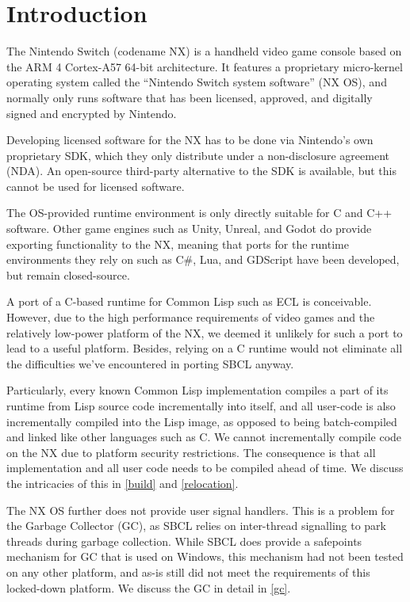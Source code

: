 \documentclass[format=sigconf]{acmart}
\begin{document}
\def\abovecaptionskip{1pt}
\def\listingautorefname{Listing}
\def\figureautorefname{Figure}

\section{Introduction}\label{introduction}
The Nintendo Switch (codename NX) is a handheld video game console based on the ARM 4 Cortex-A57 64-bit architecture\cite{morgan2020}. It features a proprietary micro-kernel operating system called the ``Nintendo Switch system software''\cite{roussel2019methodically} (NX OS), and normally only runs software that has been licensed, approved, and digitally signed and encrypted by Nintendo.

Developing licensed software for the NX has to be done via Nintendo's own proprietary SDK, which they only distribute under a non-disclosure agreement (NDA). An open-source third-party alternative to the SDK is available\cite{switchbrew}, but this cannot be used for licensed software.

The OS-provided runtime environment is only directly suitable for C and C++ software. Other game engines such as Unity, Unreal, and Godot do provide exporting functionality to the NX, meaning that ports for the runtime environments they rely on such as C\#, Lua, and GDScript have been developed, but remain closed-source.

A port of a C-based runtime for Common Lisp such as ECL\cite{attardi1994embeddable} is conceivable. However, due to the high performance requirements of video games and the relatively low-power platform of the NX, we deemed it unlikely for such a port to lead to a useful platform. Besides, relying on a C runtime would not eliminate all the difficulties we've encountered in porting SBCL anyway.

Particularly, every known Common Lisp implementation compiles a part of its runtime from Lisp source code incrementally into itself, and all user-code is also incrementally compiled into the Lisp image, as opposed to being batch-compiled and linked like other languages such as C. We cannot incrementally compile code on the NX due to platform security restrictions. The consequence is that all implementation and all user code needs to be compiled ahead of time. We discuss the intricacies of this in \autoref{build} and \autoref{relocation}.

The NX OS further does not provide user signal handlers. This is a problem for the Garbage Collector (GC), as SBCL relies on inter-thread signalling to park threads during garbage collection. While SBCL does provide a safepoints mechanism for GC that is used on Windows, this mechanism had not been tested on any other platform, and as-is still did not meet the requirements of this locked-down platform. We discuss the GC in detail in \autoref{gc}.
\end{document}
